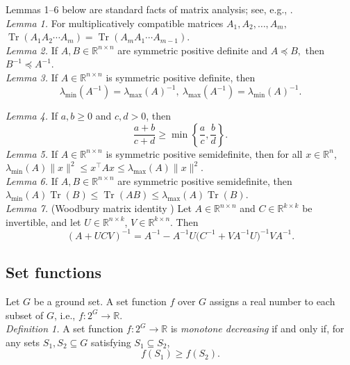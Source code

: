 \documentclass[letterpaper, 10 pt, conference]{ieeeconf}  %
\begin{document}
Lemmas 1--6 below are standard facts of matrix analysis; see, e.g., \cite{c24}. \\

\noindent \textit{Lemma 1.}
For multiplicatively compatible matrices $A_1, A_2,\dots,A_m,$
$\operatorname{Tr}(A_1A_2\cdots A_m) = \operatorname{Tr}(A_mA_1\cdots A_{m-1}).$ \\

\noindent \textit{Lemma 2.}
If \(A,B \in \mathbb{R}^{n\times n}\) are symmetric positive definite and $A \preceq B,$
then $B^{-1} \preceq A^{-1}.$ \\

\noindent \textit{Lemma 3.}
If \(A \in \mathbb{R}^{n\times n}\) is symmetric positive definite, then
\[\lambda_{\min}(A^{-1})=\lambda_{\max}(A)^{-1},
\
\lambda_{\max}(A^{-1})=\lambda_{\min}(A)^{-1}.\]

\noindent \textit{Lemma 4.}
If \(a,b \ge 0\) and \(c,d > 0\), then
\[
\frac{a+b}{c+d}
\ge
\min\left\{\frac{a}{c},\frac{b}{d}\right\}.
\]
\noindent \textit{Lemma 5.}
If \(A \in \mathbb{R}^{n\times n}\) is symmetric positive semidefinite, then for all \(x \in \mathbb{R}^n\), $\lambda_{\min}(A)\|x\|^2
\le
x^\top A x
\le
\lambda_{\max}(A)\|x\|^2.$ \\

\noindent \textit{Lemma 6.}
If \(A,B \in \mathbb{R}^{n\times n}\) are symmetric positive semidefinite, then $\lambda_{\min}(A)\operatorname{Tr}(B)
\le
\operatorname{Tr}(AB)
\le
\lambda_{\max}(A)\operatorname{Tr}(B).$ \\

\noindent \textit{Lemma 7.} (Woodbury matrix identity \cite{c25})
Let \(A \in \mathbb{R}^{n\times n}\) and \(C \in \mathbb{R}^{k\times k}\) be invertible, and let
\(U \in \mathbb{R}^{n\times k}\), \(V \in \mathbb{R}^{k\times n}\). Then
\[
(A+UCV)^{-1}
=
A^{-1}
-
A^{-1}U\bigl(C^{-1}+VA^{-1}U\bigr)^{-1}VA^{-1}.
\]

\subsection{Set functions}

Let $G$ be a ground set. A set function $f$ over $G$ assigns a real number to each subset of $G$, i.e., $f: 2^{G} \rightarrow \mathbb{R}$. \\

\noindent \textit{Definition 1.} A set function \(f:2^{G}\to\mathbb{R}\) is \emph{monotone decreasing} if and only if, for any sets \(S_1,S_2\subseteq G\) satisfying \(S_1\subseteq S_2\),
\[
f(S_1)\ge f(S_2).
\]
\end{document}
